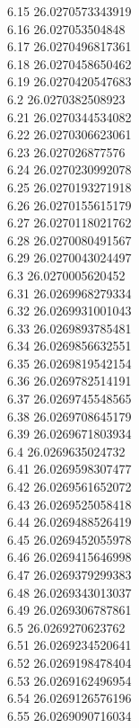 {6.15	26.0270573343919\\
6.16	26.027053504848\\
6.17	26.0270496817361\\
6.18	26.0270458650462\\
6.19	26.0270420547683\\
6.2	26.0270382508923\\
6.21	26.0270344534082\\
6.22	26.0270306623061\\
6.23	26.027026877576\\
6.24	26.0270230992078\\
6.25	26.0270193271918\\
6.26	26.0270155615179\\
6.27	26.0270118021762\\
6.28	26.0270080491567\\
6.29	26.0270043024497\\
6.3	26.0270005620452\\
6.31	26.0269968279334\\
6.32	26.0269931001043\\
6.33	26.0269893785481\\
6.34	26.0269856632551\\
6.35	26.0269819542154\\
6.36	26.0269782514191\\
6.37	26.0269745548565\\
6.38	26.0269708645179\\
6.39	26.0269671803934\\
6.4	26.0269635024732\\
6.41	26.0269598307477\\
6.42	26.0269561652072\\
6.43	26.0269525058418\\
6.44	26.0269488526419\\
6.45	26.0269452055978\\
6.46	26.0269415646998\\
6.47	26.0269379299383\\
6.48	26.0269343013037\\
6.49	26.0269306787861\\
6.5	26.0269270623762\\
6.51	26.0269234520641\\
6.52	26.0269198478404\\
6.53	26.0269162496954\\
6.54	26.0269126576196\\
6.55	26.0269090716034\\
}
